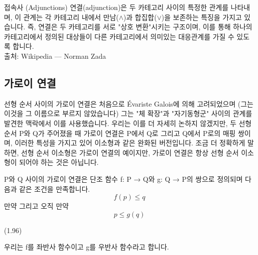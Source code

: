 \documentclass[11pt, a4paper, twoside, openany]{book}
\begin{document}
\begin{deepresearch}{접속사 (Adjunctions)}
연결(adjunction)은 두 카테고리 사이의 특정한 관계를 나타내며, 이 관계는 각 카테고리 내에서 만남($\wedge$)과 합집합($\vee$)을 보존하는 특징을 가지고 있습니다. 즉, 연결은 두 카테고리를 서로 "상호 변환"시키는 구조이며, 이를 통해 하나의 카테고리에서 정의된 대상들이 다른 카테고리에서 의미있는 대응관계를 가질 수 있도록 합니다.
\\[4pt]{\footnotesize\color{ctgray} 출처: Wikipedia — Norman Zada}
\end{deepresearch}


\subsection{가로이 연결}
\label{sec:1-4-1}

선형 순서 사이의 가로이 연결은 처음으로 Évariste Galois\hspace{0pt}에 의해 고려되었으며 (그는 이것을 그 이름으로 부르지 않았습니다) 그는 "체 확장"과 "자기동형군" 사이의 관계를 발견한 맥락에서 이를 사용했습니다. 우리는 이를 더 자세히 논하지 않겠지만, 두 선형 순서 P\hspace{0pt}와 Q\hspace{0pt}가 주어졌을 때 가로이 연결은 P\hspace{0pt}에서 Q\hspace{0pt}로 그리고 Q\hspace{0pt}에서 P\hspace{0pt}로의 매핑 쌍이며, 이러한 특성을 가지고 있어 이소형과 같은 완화된 버전입니다. 조금 더 정확하게 말하면, 선형 순서 이소형은 가로이 연결의 예이지만, 가로이 연결은 항상 선형 순서 이소형이 되어야 하는 것은 아닙니다.

\par\medskip
\begin{definitionbox}[정의 1.95.]
P\hspace{0pt}와 Q 사이의 가로이 연결은 단조 함수 f: P → Q\hspace{0pt}와 g: Q → P\hspace{0pt}의 쌍으로 정의되며 다음과 같은 조건을 만족합니다.
$$f(p) \leq q$$
만약 그리고 오직 만약
$$p \leq g(q)$$
\end{definitionbox}

\par\medskip
(1.96)

\par\medskip
우리는 f\hspace{0pt}를 좌반사 함수이고 g\hspace{0pt}를 우반사 함수라고 합니다.
\end{document}

